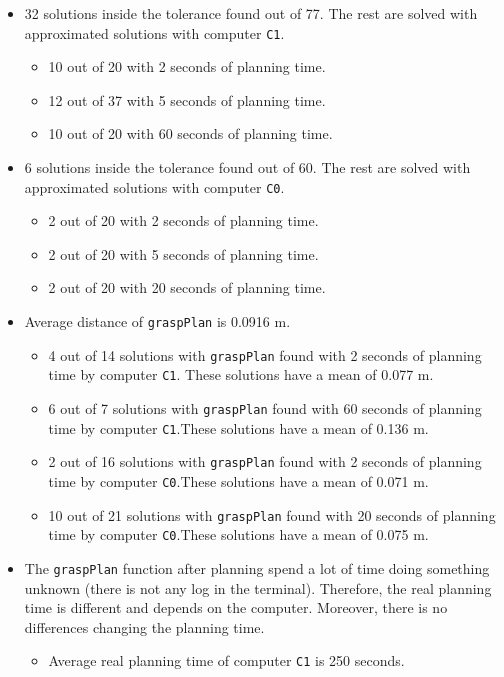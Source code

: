\documentclass[12pt,a4paper,final,twoside,openright]{report}
\begin{document}
\begin{itemize}
\item 32 solutions inside the tolerance found out of 77. The rest are solved with approximated solutions with computer \texttt{C1}.
\begin{itemize}
\item 10 out of 20 with 2 seconds of planning time.
\item 12 out of 37 with 5 seconds of planning time.
\item 10 out of 20 with 60 seconds of planning time.
\end{itemize}

\item 6 solutions inside the tolerance found out of 60. The rest are solved with approximated solutions with computer \texttt{C0}.
\begin{itemize}
\item 2 out of 20 with 2 seconds of planning time.
\item 2 out of 20 with 5 seconds of planning time.
\item 2 out of 20 with 20 seconds of planning time.
\end{itemize}
\break %
\item Average distance of \texttt{graspPlan} is 0.0916 m.
\begin{itemize}
\item 4 out of 14 solutions with \texttt{graspPlan} found with 2 seconds of planning time by computer \texttt{C1}. These solutions have a mean of 0.077 m.
\item 6 out of 7 solutions with \texttt{graspPlan} found with 60 seconds of planning time by computer \texttt{C1}.These solutions have a mean of 0.136 m.
\item 2 out of 16 solutions with \texttt{graspPlan} found with 2 seconds of planning time by computer \texttt{C0}.These solutions have a mean of 0.071 m.
\item 10 out of 21 solutions with \texttt{graspPlan} found with 20 seconds of planning time by computer \texttt{C0}.These solutions have a mean of 0.075 m.
\end{itemize}
\item The \texttt{graspPlan} function after planning spend a lot of time doing something unknown (there is not any log in the terminal). Therefore, the real planning time is different and depends on the computer. Moreover, there is no differences changing the planning time. 
\begin{itemize}
\item Average real planning time of computer \texttt{C1} is 250 seconds. 

\end{itemize}
\end{itemize}
\end{document}
